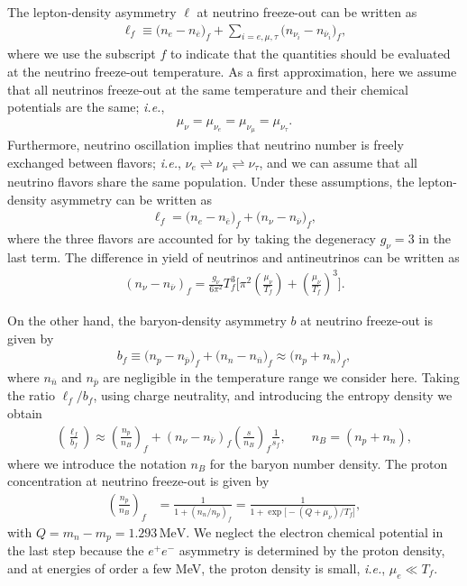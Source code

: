 The lepton-density asymmetry $\ell $ at neutrino freeze-out can be written as
\begin{align}
\ell_f \equiv\big(n_e-n_{\overline{e}}\big)_f+\sum_{i=e,\mu, \tau}\big(n_{\nu_i}-n_{\overline{\nu}_i}\big)_f,
\end{align}
where we use the subscript $f$ to indicate that the quantities should be evaluated at the neutrino freeze-out temperature. As a first approximation, here we assume that all neutrinos freeze-out at the same temperature and their chemical potentials are the same; {\it i.e.\/},
\begin{align}
\mu_\nu=\mu_{\nu_e}=\mu_{\nu_\mu}=\mu_{\nu_\tau}.
\end{align}
Furthermore, neutrino oscillation implies that neutrino number is freely exchanged between flavors; {\it i.e.\/}, $\nu_e\rightleftharpoons\nu_\mu\rightleftharpoons\nu_\tau$, and we can assume that all neutrino flavors share the same population. Under these assumptions, the lepton-density asymmetry can be written as
\begin{align}
\label{Lasymmetry}  
\ell_f=\big(n_e-n_{\overline{e}}\big)_f+\big(n_{\nu}-n_{\overline{\nu}}\big)_f,
\end{align}
where the three flavors are accounted for by taking the degeneracy $g_\nu=3$ in the last term. The difference in yield of neutrinos and antineutrinos can be written as
\begin{align}
\label{ExcessNeutrino}
\left(n_\nu-n_{\overline{\nu}}\right)_f=\frac{g_\nu}{6\pi^2}T^3_f\bigg[\pi^2\left(\frac{\mu_\nu}{T_f}\right)+\left(\frac{\mu_\nu}{T_f}\right)^{\!\!3}\bigg].
\end{align}


On the other hand, the baryon-density asymmetry $b$ at neutrino freeze-out is given by
\begin{align}
\label{Basymmetry}
b_f \equiv\big(n_p-n_{\overline{p}}\big)_f+\big(n_n-n_{\overline{n}}\big)_f \approx \big(n_p+n_n\big)_f,
\end{align}
where $n_{\overline{n}}$ and $n_{\overline{p}}$ are negligible in the temperature range we consider here. Taking the ratio $\ell_f/b_f$, using charge neutrality, and introducing the entropy density we obtain
\begin{align}\label{LfBf}
\left(\frac{\ell_f}{b_f}\right)  
\approx\left(\frac{n_p}{n_B} \right)_f+\left(n_{\nu}-n_{\overline{\nu}}\right)_f \left(\frac{s}{n_B}\right)_f \frac{1}{s_f},\qquad n_B=(n_p+n_n),
\end{align}
where we introduce the notation $n_B$ for the baryon number density. The proton concentration at neutrino freeze-out is given by
\begin{align}
\label{X:proton}
\left(\frac{n_p}{n_B}\right)_f&=\frac{1}{1+(n_n/n_p)_f}=\frac{1}{1+\exp{\big[-\left(Q+\mu_\nu\right)/T_f\big]}},
\end{align}
with $Q=m_n-m_p=1.293\,\mathrm{MeV}$. We neglect the electron chemical potential in the last step because the $e^+e^-$ asymmetry is determined by the proton density, and at energies of order a few MeV, the proton density is small, {\it i.e.\/}, $\mu_e\ll T_f$. 

